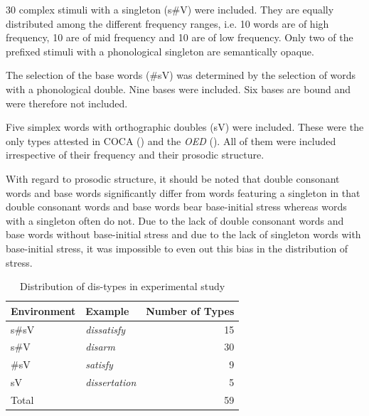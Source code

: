 30 complex stimuli with a singleton (s\#V) were included. They are equally distributed among the different frequency ranges, i.e. 10 words are of high frequency, 10 are of mid frequency and 10 are of low frequency. 
Only two of the prefixed stimuli with a phonological singleton are semantically opaque. 


The selection of the base words (\#sV) was determined by the selection of words with a phonological double. 
Nine bases were included. Six bases are bound and were therefore not included. 

Five simplex words with orthographic doubles (sV) were included. These were the only types attested in COCA (\citealt{Davies.20082014}) and the \textit{OED} (\citealt{OED.2013}). 
All of them were included irrespective of their frequency and their prosodic structure. 

With regard to prosodic structure, it should be noted that double consonant words and base words significantly differ from words featuring a singleton in that double consonant words and base words bear base-initial stress whereas words with a singleton often do not. Due to the lack of double consonant words and base words without base-initial stress and due to the lack of singleton words with base-initial stress, it was impossible to even out this bias in the distribution of stress.


\begin{table}[h!]
	\caption{Distribution of dis-types in experimental study}
	\label{tbl:distribution of dis types in experiment}

	
		\begin{tabular} {llr}

			Environment & Example & Number of  Types\\

			\midrule
			s\#sV&\color[HTML]{3166FF}\textit{dissatisfy} & 15 \\ 
			s\#V&\color[HTML]{3166FF}\textit{disarm} & 30\\ 
			\#sV&\color[HTML]{3166FF}\textit{satisfy} & 9\\ 
			sV&\color[HTML]{3166FF}\textit{dissertation} & 5 \\ 
			\midrule   	
			Total&  & 59\\ 
			\midrule   	


		\end{tabular}
	
\end{table}



